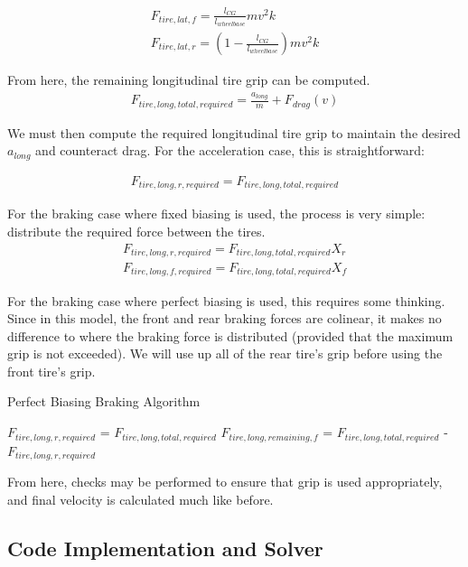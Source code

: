 \documentclass{article}
\begin{document}
\begin{align}
	F_{tire,lat,f} = \frac{l_{CG}}{l_{wheelbase}} m v^2 k \\ 
	F_{tire,lat,r} = (1-\frac{l_{CG}}{l_{wheelbase}}) m v^2 k
\end{align}

From here, the remaining longitudinal tire grip can be computed.
\begin{align}
	F_{tire,long,total,required} = \frac{a_{long}}{m} + F_{drag}(v)
\end{align}

We must then compute the required longitudinal tire grip to maintain the desired $a_{long}$ and counteract drag. For the acceleration case, this is straightforward:

\begin{align}
	F_{tire,long,r,required} = F_{tire,long,total,required}
\end{align}

For the braking case where fixed biasing is used, the process is very simple: distribute the required force between the tires.
\begin{align}
	F_{tire,long,r,required} = F_{tire,long,total,required} X_r \\
	F_{tire,long,f,required} = F_{tire,long,total,required} X_f
\end{align}

For the braking case where perfect biasing is used, this requires some thinking. Since in this model, the front and rear braking forces are colinear, it makes no difference to where the braking force is distributed (provided that the maximum grip is not exceeded). We will use up all of the rear tire's grip before using the front tire's grip.

\begin{algorithm}[H]
\caption{Perfect Biasing Braking Algorithm}
\begin{algorithmic}[1]
	\State $F_{tire,long,r,required}$ = $F_{tire,long,total,required}$
	\State	$F_{tire,long,remaining,f}$ = $F_{tire,long,total,required}$ - $F_{tire,long,r,required}$
	\EndIf
\end{algorithmic}
\end{algorithm}

From here, checks may be performed to ensure that grip is used appropriately, and final velocity is calculated much like before.

\subsection{Code Implementation and Solver}
\end{document}
